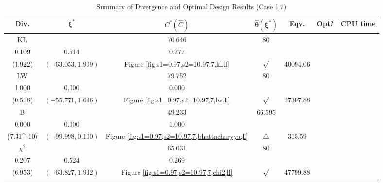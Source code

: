 \documentclass[12pt, a4paper]{article}
\begin{document}
\begin{table}[H]
\centering
\renewcommand{\arraystretch}{1.5} %
\setlength{\tabcolsep}{8pt} %
\begin{tabular}{|c|c|c|c|c|c|c|}
\hline
\textbf{Div.} & \(\boldsymbol{\xi^*}\) & \(C^* (\hat{C})\) & \(\boldsymbol{\hat{\theta}(\xi^*)}\) & \textbf{Eqv.} & \textbf{Opt?} & \textbf{CPU time} \\
\hline
KL & \(\left\{\begin{array}{ccc}
57.381 & 70.646 & 80 \\
0.109 & 0.614 & 0.277
\end{array}\right\}\) &
\(\begin{array}{c}
1.922 \\
(1.922)
\end{array}\) & 
\((-63.053, 1.909)\) & 
Figure \ref{fig:s1=0.97,s2=10.97,7,kl,ll} & $\surd$ & 40094.06 \\
\hline
LW & \(\left\{\begin{array}{ccc}
66.317 & 79.752 & 80 \\
1.000 & 0.000 & 0.000
\end{array}\right\}\) &
\(\begin{array}{c}
0.518 \\
(0.518)
\end{array}\) & 
\((-55.771, 1.696)\) & 
Figure \ref{fig:s1=0.97,s2=10.97,7,lw,ll} & $\surd$ & 27307.88 \\
\hline
B & \(\left\{\begin{array}{ccc}
31.243 & 49.233 & 66.595 \\
0.000 & 0.000 & 1.000
\end{array}\right\}\) &
\(\begin{array}{c}
1.91\times 10^{-7} \\
(7.31\times 10^{-10})
\end{array}\) & 
\((-99.998, 0.100)\) & 
Figure \ref{fig:s1=0.97,s2=10.97,7,bhattacharyya,ll} & $\triangle$ & 315.59 \\
\hline
\(\chi^2\) & \(\left\{\begin{array}{ccc}
50.53 & 65.031 & 80 \\
0.207 & 0.524 & 0.269
\end{array}\right\}\) &
\(\begin{array}{c}
6.953 \\
(6.953)
\end{array}\) & 
\((-63.827, 1.932)\) & 
Figure \ref{fig:s1=0.97,s2=10.97,7,chi2,ll} & $\surd$ & 47799.88 \\
\hline
\end{tabular}
\caption{Summary of Divergence and Optimal Design Results (Case 1.7)}
\label{tab:results1.7}
\end{table}
\end{document}

